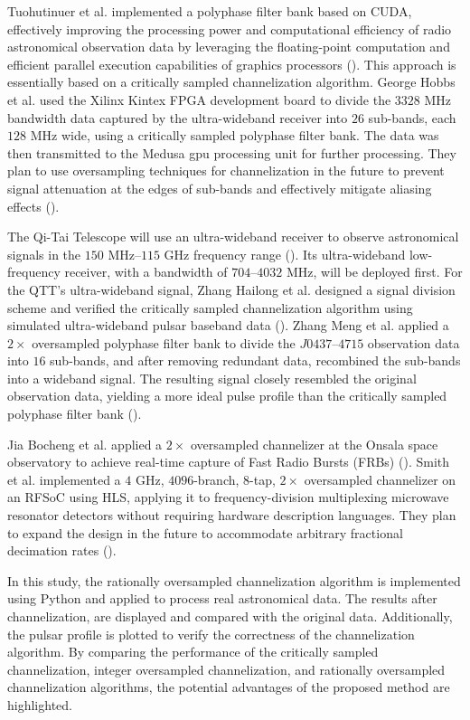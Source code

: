 \documentclass[referee]{raa}
\begin{document}
Tuohutinuer et al. implemented a polyphase filter bank based on CUDA, effectively improving the processing power and computational efficiency of radio astronomical observation data by leveraging the floating-point computation and efficient parallel execution capabilities of graphics processors (\citealt{Tohtonur+2017}). This approach is essentially based on a critically sampled channelization algorithm. George Hobbs et al. used the Xilinx Kintex FPGA development board to divide the $3328$ MHz bandwidth data captured by the ultra-wideband receiver into $26$ sub-bands, each $128$ MHz wide, using a critically sampled polyphase filter bank. The data was then transmitted to the Medusa gpu processing unit for further processing. They plan to use oversampling techniques for channelization in the future to prevent signal attenuation at the edges of sub-bands and effectively mitigate aliasing effects (\citealt{Hobbs+2020}).

The Qi-Tai Telescope will use an ultra-wideband receiver to observe astronomical signals in the $150$ MHz–$115$ GHz frequency range (\citealt{Wang+2023}). Its ultra-wideband low-frequency receiver, with a bandwidth of $704$–$4032$ MHz, will be deployed first. For the QTT's ultra-wideband signal, Zhang Hailong et al. designed a signal division scheme and verified the critically sampled channelization algorithm using simulated ultra-wideband pulsar baseband data (\citealt{ZhangHl+2023}). Zhang Meng et al. applied a $2\times$ oversampled polyphase filter bank to divide the $J0437$–$4715$ observation data into $16$ sub-bands, and after removing redundant data, recombined the sub-bands into a wideband signal. The resulting signal closely resembled the original observation data, yielding a more ideal pulse profile than the critically sampled polyphase filter bank (\citealt{ZhangM+2023}).

Jia Bocheng et al. applied a $2\times$ oversampled channelizer at the Onsala space observatory to achieve real-time capture of Fast Radio Bursts (FRBs) (\citealt{Jia+2021}). Smith et al. implemented a $4$ GHz, $4096$-branch, $8$-tap, $2\times$ oversampled channelizer on an RFSoC using HLS, applying it to frequency-division multiplexing microwave resonator detectors without requiring hardware description languages. They plan to expand the design in the future to accommodate arbitrary fractional decimation rates (\citealt{Smith+2021}).

In this study, the rationally oversampled channelization algorithm is implemented using Python and applied to process real astronomical data. The results after channelization, are displayed and compared with the original data. Additionally, the pulsar profile is plotted to verify the correctness of the channelization algorithm. By comparing the performance of the critically sampled channelization, integer oversampled channelization, and rationally oversampled channelization algorithms, the potential advantages of the proposed method are highlighted. 
\end{document}
